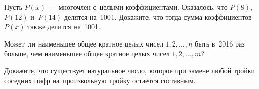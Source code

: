 \begin{problems}
\item
Пусть $P(x)$~--- многочлен с~целыми коэффициентами.
Оказалось, что $P(8)$, $P(12)$ и~$P(14)$ делятся на~1001.
Докажите, что тогда сумма коэффициентов $P(x)$ также делится на~1001.

\item
Может~ли наименьшее общее кратное целых чисел $1, 2, \ldots, n$ быть
в~2016 раз больше, чем наименьшее общее кратное целых чисел $1, 2, \ldots, m$?

\item
Докажите, что существует натуральное число, которое при замене любой тройки
соседних цифр на~произвольную тройку остается составным.

\end{problems}

